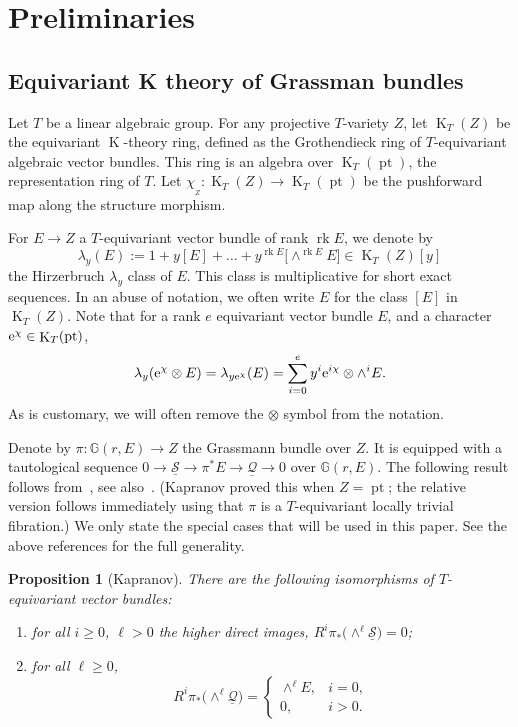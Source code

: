 \documentclass[pdftex]{sigma}
\numberwithin{equation}{section}
\newtheorem{Proposition}[Theorem]{Proposition}
\theoremstyle{definition}
\DeclareMathOperator{\K}{K}
\DeclareMathOperator{\pt}{pt}
\newcommand{\cQ}{{\mathcal Q}}
\newcommand{\cS}{{\mathcal S}}
\newcommand{\euler}[1]{\chi_{_{#1}}}
\begin{document}
\section{Preliminaries}
\subsection{Equivariant K theory of Grassman bundles}
Let $T$ be a linear algebraic group. For any projective $T$-variety $Z$,
let $\K_T(Z)$ be the equivariant $\K$-theory
ring, defined as the Grothendieck ring of $T$-equivariant algebraic vector
bundles. This ring is an algebra over $\K_T(\pt)$, the representation ring of
$T$. Let $\euler{Z}\colon \K_T(Z) \to \K_T(\pt)$ be the pushforward map along the
structure morphism.

For $E \to Z$ a $T$-equivariant
vector bundle of rank $\operatorname{rk}E$, we denote by
\[ \lambda_y(E) := 1 + y [E] + \dots + y^{\operatorname{rk}E} \bigl[\wedge^{\operatorname{rk}E} E\bigr] \in \K_T(Z)[y] \]
the Hirzerbruch $\lambda_y$ class of $E$. This class is multiplicative for short exact sequences. {In an abuse of notation, we often write $E$ for the class $[E]$ in $\K_T(Z)$.} Note that for a rank $e$ equivariant vector bundle $E$, and a character ${\rm e}^\chi \in \K_T(\pt)$,
\[ \lambda_y( {\rm e}^\chi \otimes E) = \lambda_{y {\rm e}^{\chi}}(E) = \sum_{i=0}^{e} y^i {\rm e}^{i \chi} \otimes \wedge^i E . \]
As is customary, we will often remove the $\otimes$ symbol from the notation.

Denote by
$\pi\colon \mathbb{G}(r,E) \to Z$ the Grassmann bundle over $Z$.
It is equipped with a tautological sequence
$0 \to \underline{\cS} \to \pi^* E \to \underline{\cQ} \to 0$ over
$\mathbb{G}(r,E)$. The following result follows
from~\cite[Proposition~2.2]{kapranov:Gr}, see also~\cite[Proposition~3.2 and Corollary~3.3]{gu2022quantum}.
(Kapranov proved this when $Z=\pt$; the relative version follows immediately
using that $\pi$ is a $T$-equivariant locally trivial fibration.) We only state the special cases that will be used in this paper. See the above references for the full generality.

\begin{Proposition}[Kapranov]\label{prop:relativeBWB}
 There are the following isomorphisms of $T$-equivariant vector bundles:
 \begin{enumerate}\itemsep=0pt
 \item[$(1)$] for all $i \ge 0$, $\ell>0$ the higher direct images, $R^i \pi_* \bigl(\wedge^\ell\underline{\cS}\bigr) = 0$;
 \item[$(2)$] for all $\ell\geq 0$, \[ R^i \pi_*\bigl(\wedge^\ell\underline{\cQ}\bigr) = \begin{cases} \wedge^\ell E, & i=0, \\ 0, & i>0 . \end{cases}\]
 \end{enumerate}
 \end{Proposition}
\end{document}
